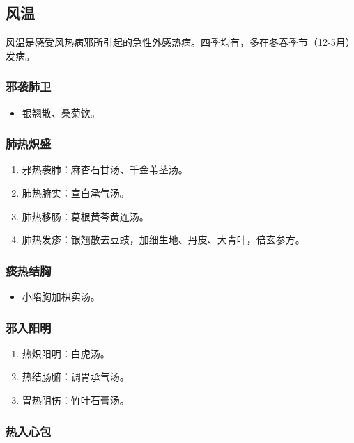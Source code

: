 \documentclass[cn,black,12pt,founder,normal,twocolumn]{elegantnote}
\begin{document}
\subsection{风温}

风温是感受风热病邪所引起的急性外感热病。四季均有，多在冬春季节（12-5月）发病。

\subsubsection{邪袭肺卫}

\begin{itemize}
    \item 银翘散、桑菊饮。
\end{itemize}

\subsubsection{肺热炽盛}

\begin{enumerate}
    \item 邪热袭肺：麻杏石甘汤、千金苇茎汤。
    \item 肺热腑实：宣白承气汤。
    \item 肺热移肠：葛根黄芩黄连汤。
    \item 肺热发疹：银翘散去豆豉，加细生地、丹皮、大青叶，倍玄参方。
\end{enumerate}

\subsubsection{痰热结胸}

\begin{itemize}
    \item 小陷胸加枳实汤。
\end{itemize}

\subsubsection{邪入阳明}

\begin{enumerate}
    \item 热炽阳明：白虎汤。
    \item 热结肠腑：调胃承气汤。
    \item 胃热阴伤：竹叶石膏汤。
\end{enumerate}

\subsubsection{热入心包}
\end{document}
